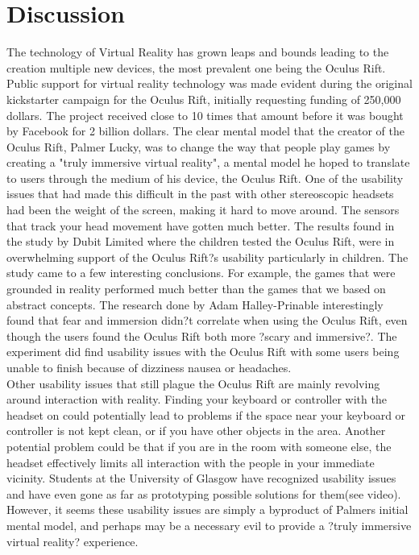 \documentclass[a4paper]{article}
\begin{document}
\section{Discussion}


\indent \indent The technology of Virtual Reality has grown leaps and bounds leading to the creation multiple new devices, the most prevalent one being the Oculus Rift. Public support for virtual reality technology was made evident during the original kickstarter campaign for the Oculus Rift, initially requesting funding of 250,000 dollars. The project received close to 10 times that amount before it was bought by Facebook for 2 billion dollars. The clear mental model that the creator of the Oculus Rift, Palmer Lucky, was to change the way that people play games by creating a "truly immersive virtual reality"\cite{3}, a mental model he hoped to translate to users through the medium of his device, the Oculus Rift. One of the usability issues that had made this difficult in the past with other stereoscopic headsets had been the weight of the screen, making it hard to move around. The sensors that track your head movement have gotten much better. The results found in the study by Dubit Limited where the children tested the Oculus Rift, were in overwhelming support of the Oculus Rift?s usability particularly in children. The study came to a few interesting conclusions. For example, the games that were grounded in reality performed much better than the games that we based on abstract concepts. The research done by Adam Halley-Prinable interestingly found that fear and immersion didn?t correlate when using the Oculus Rift, even though the users found the Oculus Rift both more ?scary and immersive?\cite{7}. The experiment did find usability issues with the Oculus Rift with some users being unable to finish because of dizziness nausea or  headaches.\\
\indent Other usability issues that still plague the Oculus Rift are mainly revolving around interaction with reality. Finding your keyboard or controller with the headset on could potentially lead to problems if the space near your keyboard or controller is not kept clean, or if you have other objects in the area. Another potential problem could be that if you are in the room with someone else, the headset effectively limits all interaction with the people in your immediate vicinity. Students at the University of Glasgow have recognized usability issues and have even gone as far as prototyping possible solutions for them(see video\cite{5}). However, it seems these usability issues are simply a byproduct of Palmers initial mental model, and perhaps may be a necessary evil to provide a ?truly immersive virtual reality? experience\cite{3}.\\ 
\end{document}
